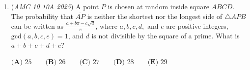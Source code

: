 \begin{enumerate}
	\item (\textit{AMC 10 10A 2025}) A point $P$ is chosen at random inside square $ABCD$. The probability that $\overline{AP}$ is neither the shortest nor the longest side of $\triangle APB$ can be written as $\frac{a + b \pi - c \sqrt{d}}{e}$, where $a, b, c, d,$ and $e$ are positive integers, $\text{gcd}(a, b, c, e) = 1$, and $d$ is not divisible by the square of a prime. What is $a+b+c+d+e$?


 $\textbf{(A) }25 \qquad \textbf{(B) }26 \qquad \textbf{(C) }27 \qquad \textbf{(D) }28 \qquad \textbf{(E) }  29 \qquad$


\end{enumerate}